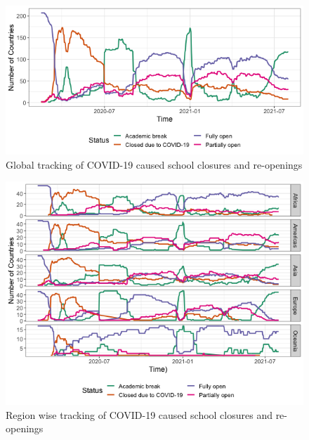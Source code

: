 \documentclass[11pt,a4paper,]{article}
\begin{document}
\begin{figure}[h]

{\centering \includegraphics[width=1\textwidth]{figure/covidImpactWorld-1} 

}

\caption{Global tracking of COVID-19 caused school closures and re-openings}\label{fig:covidImpactWorld}
\end{figure}

\begin{figure}[h]

{\centering \includegraphics[width=1\textwidth]{figure/covidImpactContinent-1} 

}

\caption{Region wise tracking of COVID-19 caused school closures and re-openings}\label{fig:covidImpactContinent}
\end{figure}
\end{document}
